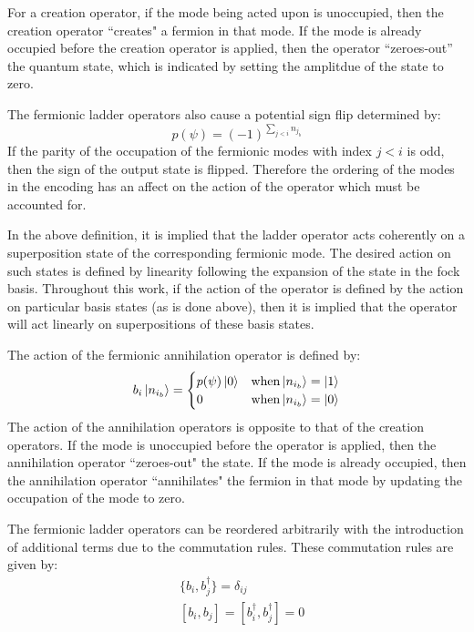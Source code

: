 For a creation operator, if the mode being acted upon is unoccupied, then the creation operator ``creates" a fermion in that mode.
If the mode is already occupied before the creation operator is applied, then the operator ``zeroes-out'' the quantum state, which is indicated by setting the amplitdue of the state to zero.

The fermionic ladder operators also cause a potential sign flip determined by:
\begin{equation}
    \label{eq:parity}
    p(\psi) = (-1)^{\sum_{j < i} n_{j_b}}
\end{equation}
If the parity of the occupation of the fermionic modes with index $j < i$ is odd, then the sign of the output state is flipped.
Therefore the ordering of the modes in the encoding has an affect on the action of the operator which must be accounted for.

In the above definition, it is implied that the ladder operator acts coherently on a superposition state of the corresponding fermionic mode.
The desired action on such states is defined by linearity following the expansion of the state in the fock basis.
Throughout this work, if the action of the operator is defined by the action on particular basis states (as is done above), then it is implied that the operator will act linearly on superpositions of these basis states. 

The action of the fermionic annihilation operator is defined by:
\begin{equation}
    \label{eq:fermionic-annihilation}
    b_i \ket{n_{i_b}} = 
    \begin{cases} 
        p(\psi) \ket{0}  & {\rm when} \ket{n_{i_b}} = \ket{1} \\
        0 & {\rm when} \ket{n_{i_b}} = \ket{0}
    \end{cases}
\end{equation}
The action of the annihilation operators is opposite to that of the creation operators.
If the mode is unoccupied before the operator is applied, then the annihilation operator ``zeroes-out" the state.
If the mode is already occupied, then the annihilation operator ``annihilates" the fermion in that mode by updating the occupation of the mode to zero.

The fermionic ladder operators can be reordered arbitrarily with the introduction of additional terms due to the commutation rules.
These commutation rules are given by:
\begin{equation}
    \label{eq:fermionic-commutation}
    \begin{split}
        &\{b_i, b_j^\dagger\} = \delta_{ij}\\
        & [b_i, b_j] = [b_i^\dagger, b_j^\dagger] = 0 \\
    \end{split}
\end{equation}


